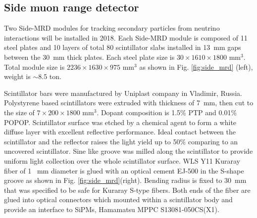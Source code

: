 \subsection{Side muon range detector}
Two Side-MRD modules for tracking secondary particles from neutrino interactions will be installed in 2018. 
Each Side-MRD module is composed of 11  steel plates and 10 layers of total 80 scintillator slabs installed  in 13~mm gaps between the 30~mm thick plates. Each steel plate size is  $30\times1610\times1800$ mm$^{3}$. Total module size  is  $2236\times1630\times975$ mm$^{3}$ as shown in Fig. \ref{fig:side_mrd} (left), weight is $\sim$8.5 ton. 

Scintillator bars were manufactured by Uniplast company in Vladimir, Russia. Polystyrene based scintillators were extruded with thickness of 7~mm, then cut to the size of $7\times200\times1800$ mm$^{3}$. Dopant composition is  1.5\% PTP and 0.01\% POPOP.
Scintillator surface was etched by a chemical agent to form a white diffuse layer with excellent reflective performance. 
Ideal contact between the scintillator and the reflector raises the light yield up to 50\% comparing to an uncovered scintillator. 
Sine like groove was milled along the scintillator to provide uniform light collection over the whole scintillator surface. 
WLS Y11 Kuraray fiber of 1 ~mm diameter is glued with an optical cement EJ-500 in the S-shape groove  as shown in Fig. \ref{fig:side_mrd}(right). Bending radius is fixed to  30~mm that was specified to be safe for Kuraray S-type fibers.
Both ends of the fiber are glued into optical connectors %
which mounted within a scintillator body and provide an interface to SiPMs, Hamamatsu  MPPC S13081-050CS(X1). 


